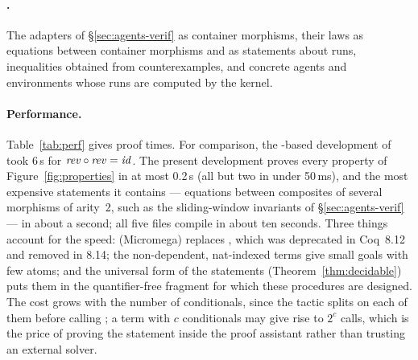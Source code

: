 \documentclass{fundam}
\begin{document}
\paragraph{.}  The adapters of \S\ref{sec:agents-verif} as container
morphisms, their laws as equations between container morphisms and as statements about
runs, inequalities obtained from counterexamples, and concrete agents and environments
whose runs are computed by the kernel.

\paragraph{Performance.}  Table~\ref{tab:perf} gives proof times.  For comparison, the
-based development of \cite{Prince10} took 6\,s for $\mathit{rev} \circ \mathit{rev} = \mathit{id}$.
The present development proves every property of Figure~\ref{fig:properties} in at most
0.2\,s (all but two in under 50\,ms), and the most expensive statements it contains ---
equations between composites of several morphisms of arity~2, such as the
sliding-window invariants of \S\ref{sec:agents-verif} --- in about a second; all five
files compile in about ten seconds.  Three things account for the speed: 
(Micromega) replaces , which was deprecated in Coq~8.12 and removed in 8.14;
the non-dependent, nat-indexed terms give  small goals with few atoms; and the
universal form of the statements (Theorem~\ref{thm:decidable}) puts them in the
quantifier-free fragment for which these procedures are designed.  The cost grows with
the number of conditionals, since the tactic splits on each of them before calling
; a term with $c$ conditionals may give rise to $2^c$ calls, which is the
price of proving the statement inside the proof assistant rather than trusting an
external solver.
\end{document}
